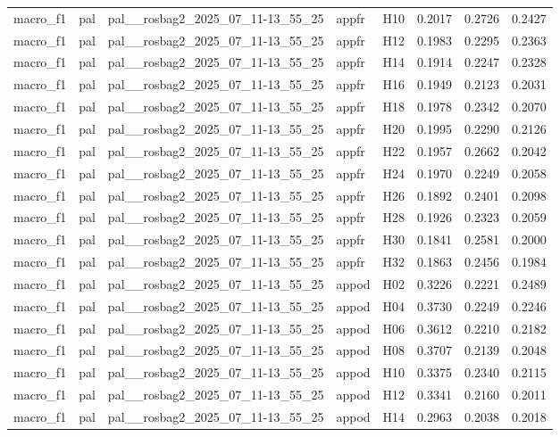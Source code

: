 \begin{table}[tbp]
\begin{tabular}{lllllrrr}
macro\_f1 & pal & pal\_\_rosbag2\_2025\_07\_11-13\_55\_25 & appfr & H10 & 0.2017 & 0.2726 & 0.2427 \\
macro\_f1 & pal & pal\_\_rosbag2\_2025\_07\_11-13\_55\_25 & appfr & H12 & 0.1983 & 0.2295 & 0.2363 \\
macro\_f1 & pal & pal\_\_rosbag2\_2025\_07\_11-13\_55\_25 & appfr & H14 & 0.1914 & 0.2247 & 0.2328 \\
macro\_f1 & pal & pal\_\_rosbag2\_2025\_07\_11-13\_55\_25 & appfr & H16 & 0.1949 & 0.2123 & 0.2031 \\
macro\_f1 & pal & pal\_\_rosbag2\_2025\_07\_11-13\_55\_25 & appfr & H18 & 0.1978 & 0.2342 & 0.2070 \\
macro\_f1 & pal & pal\_\_rosbag2\_2025\_07\_11-13\_55\_25 & appfr & H20 & 0.1995 & 0.2290 & 0.2126 \\
macro\_f1 & pal & pal\_\_rosbag2\_2025\_07\_11-13\_55\_25 & appfr & H22 & 0.1957 & 0.2662 & 0.2042 \\
macro\_f1 & pal & pal\_\_rosbag2\_2025\_07\_11-13\_55\_25 & appfr & H24 & 0.1970 & 0.2249 & 0.2058 \\
macro\_f1 & pal & pal\_\_rosbag2\_2025\_07\_11-13\_55\_25 & appfr & H26 & 0.1892 & 0.2401 & 0.2098 \\
macro\_f1 & pal & pal\_\_rosbag2\_2025\_07\_11-13\_55\_25 & appfr & H28 & 0.1926 & 0.2323 & 0.2059 \\
macro\_f1 & pal & pal\_\_rosbag2\_2025\_07\_11-13\_55\_25 & appfr & H30 & 0.1841 & 0.2581 & 0.2000 \\
macro\_f1 & pal & pal\_\_rosbag2\_2025\_07\_11-13\_55\_25 & appfr & H32 & 0.1863 & 0.2456 & 0.1984 \\
macro\_f1 & pal & pal\_\_rosbag2\_2025\_07\_11-13\_55\_25 & appod & H02 & 0.3226 & 0.2221 & 0.2489 \\
macro\_f1 & pal & pal\_\_rosbag2\_2025\_07\_11-13\_55\_25 & appod & H04 & 0.3730 & 0.2249 & 0.2246 \\
macro\_f1 & pal & pal\_\_rosbag2\_2025\_07\_11-13\_55\_25 & appod & H06 & 0.3612 & 0.2210 & 0.2182 \\
macro\_f1 & pal & pal\_\_rosbag2\_2025\_07\_11-13\_55\_25 & appod & H08 & 0.3707 & 0.2139 & 0.2048 \\
macro\_f1 & pal & pal\_\_rosbag2\_2025\_07\_11-13\_55\_25 & appod & H10 & 0.3375 & 0.2340 & 0.2115 \\
macro\_f1 & pal & pal\_\_rosbag2\_2025\_07\_11-13\_55\_25 & appod & H12 & 0.3341 & 0.2160 & 0.2011 \\
macro\_f1 & pal & pal\_\_rosbag2\_2025\_07\_11-13\_55\_25 & appod & H14 & 0.2963 & 0.2038 & 0.2018 \\

\end{tabular}
\end{table}
